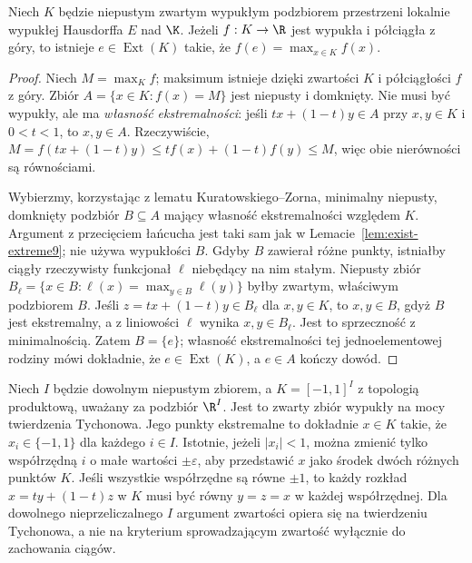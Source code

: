 \begin{wniosek}
\label{cor:bauer9}
Niech $K$ będzie niepustym zwartym wypukłym podzbiorem
przestrzeni lokalnie wypukłej Hausdorffa $E$ nad $\K$.
Jeżeli $f:K\to\R$ jest wypukła i półciągła z góry,
to istnieje $e\in\operatorname{Ext}(K)$ takie,
że $f(e)=\max_{x\in K}f(x)$.
\end{wniosek}
\begin{proof}
Niech $M=\max_K f$; maksimum istnieje dzięki zwartości $K$
i półciągłości $f$ z góry. Zbiór $A=\{x\in K:f(x)=M\}$
jest niepusty i domknięty. Nie musi być wypukły, ale ma
\emph{własność ekstremalności}: jeśli $tx+(1-t)y\in A$
przy $x,y\in K$ i $0<t<1$, to $x,y\in A$. Rzeczywiście,
$M=f(tx+(1-t)y)\le tf(x)+(1-t)f(y)\le M$,
więc obie nierówności są równościami.

Wybierzmy, korzystając z lematu Kuratowskiego--Zorna,
minimalny niepusty, domknięty podzbiór $B\subseteq A$
mający własność ekstremalności względem $K$.
Argument z przecięciem łańcucha jest taki sam jak
w Lemacie~\ref{lem:exist-extreme9}; nie używa wypukłości $B$.
Gdyby $B$ zawierał różne punkty, istniałby ciągły rzeczywisty
funkcjonał $\ell$ niebędący na nim stałym. Niepusty zbiór
$B_\ell=\{x\in B:\ell(x)=\max_{y\in B}\ell(y)\}$
byłby zwartym, właściwym podzbiorem $B$.
Jeśli $z=tx+(1-t)y\in B_\ell$ dla $x,y\in K$, to
$x,y\in B$, gdyż $B$ jest ekstremalny, a z liniowości
$\ell$ wynika $x,y\in B_\ell$. Jest to sprzeczność
z minimalnością. Zatem $B=\{e\}$; własność ekstremalności
tej jednoelementowej rodziny mówi dokładnie,
że $e\in\operatorname{Ext}(K)$, a $e\in A$ kończy dowód.
\end{proof}

\begin{przyklad}
\label{ex:krein-cube9}
Niech $I$ będzie dowolnym niepustym zbiorem,
a $K=[-1,1]^I$ z topologią produktową, uważany za
podzbiór $\R^I$. Jest to zwarty zbiór wypukły na mocy
twierdzenia Tychonowa. Jego punkty ekstremalne to dokładnie
$x\in K$ takie, że $x_i\in\{-1,1\}$ dla każdego $i\in I$.
Istotnie, jeżeli $|x_i|<1$, można zmienić tylko współrzędną
$i$ o małe wartości $\pm\varepsilon$, aby przedstawić
$x$ jako środek dwóch różnych punktów $K$.
Jeśli wszystkie współrzędne są równe $\pm1$, to każdy
rozkład $x=ty+(1-t)z$ w $K$ musi być równy $y=z=x$
w każdej współrzędnej.
Dla dowolnego nieprzeliczalnego $I$ argument zwartości
opiera się na twierdzeniu Tychonowa, a nie na kryterium
sprowadzającym zwartość wyłącznie do zachowania ciągów.
\end{przyklad}

